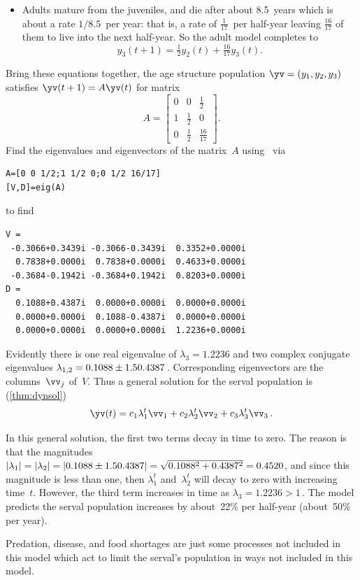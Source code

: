 \begin{example}
\begin{solution}
\begin{itemize}
\item Adults mature from the juveniles, and die after about 8.5~years which is about a rate \(1/8.5\)~per year: that is, a rate of \(\frac1{17}\)~per half-year leaving \(\tfrac{16}{17}\) of them to live into the next half-year.
So the adult model completes to 
\begin{equation*}
y_3(t+1)=\tfrac12y_2(t)+\tfrac{16}{17}y_3(t).
\end{equation*}

\end{itemize}

Bring these equations together, the age structure population \(\yv=(y_1,y_2,y_3)\) satisfies \(\yv(t+1)=A\yv(t)\) for matrix
\begin{equation*}
A=\begin{bmatrix} 0&0&\frac1{2}
\\1&\frac12&0
\\0&\frac12&\frac{16}{17} \end{bmatrix}.
\end{equation*}
Find the eigenvalues and eigenvectors of the matrix~\(A\) using \script\ via
\begin{verbatim}
A=[0 0 1/2;1 1/2 0;0 1/2 16/17]
[V,D]=eig(A)
\end{verbatim}
\setbox\ajrqrbox\hbox{}%
\marginpar{\usebox{\ajrqrbox}}%
to find
\begin{verbatim}
V =
 -0.3066+0.3439i -0.3066-0.3439i  0.3352+0.0000i
  0.7838+0.0000i  0.7838+0.0000i  0.4633+0.0000i
 -0.3684-0.1942i -0.3684+0.1942i  0.8203+0.0000i
D =
  0.1088+0.4387i  0.0000+0.0000i  0.0000+0.0000i
  0.0000+0.0000i  0.1088-0.4387i  0.0000+0.0000i
  0.0000+0.0000i  0.0000+0.0000i  1.2236+0.0000i
\end{verbatim}
Evidently there is one real eigenvalue of \(\lambda_3=1.2236\) and two complex conjugate eigenvalues \(\lambda_{1,2}=0.1088\pm 1.50.4387\)\,.
Corresponding eigenvectors are the columns~\(\vv_j\) of~\(V\).
Thus a general solution for the serval population is (\autoref{thm:dynsol})
\begin{equation*}
\yv(t)=c_1\lambda_1^t\vv_1+c_2\lambda_2^t\vv_2+c_3\lambda_3^t\vv_3\,.
\end{equation*}

In this general solution, the first two terms decay in time to zero.
The reason is that the magnitudes \(|\lambda_1|=|\lambda_2|=|0.1088\pm 1.50.4387|=\sqrt{0.1088^2+0.4387^2}=0.4520\), and since this magnitude is less than one, then \(\lambda_1^t\) and~\(\lambda_2^t\) will decay to zero with increasing time~\(t\).
However, the third term increases in time as \(\lambda_3=1.2236>1\)\,.
The model predicts the serval population increases by about~22\% per half-year (about~50\% per year).
\end{solution} 
Predation, disease, and food shortages are just some processes not included in this model which act to limit the serval's population in ways not included in this model.
\end{example}





